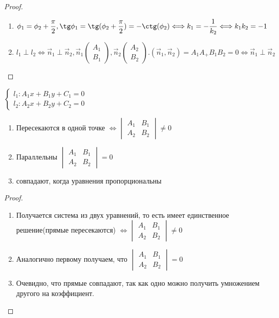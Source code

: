 \begin{proof}
	\begin{enumerate}
		\item \(\phi_1 = \phi_2 + \dfrac{\pi}{2}, \tg\phi_1 = \tg(\phi_2 + \dfrac{\pi}{2}) = -\ctg(\phi_2)\Longleftrightarrow k_1 = -\dfrac{1}{k_2}\Longleftrightarrow k_1k_2 = -1\)
		\item \(l_1 \perp l_2 \Longleftrightarrow \vec n_1 \perp \vec n_2, \vec n_1\begin{pmatrix}
			A_1 \\ B_1
		\end{pmatrix}, \vec n_2 \begin{pmatrix}
		A_2 \\ B_2
		\end{pmatrix}. (\vec n_1, \vec n_2) = A_1A_+B_1B_2 = 0 \Longleftrightarrow \vec n_1 \perp \vec n_2\)
	\end{enumerate}
\end{proof}
\begin{proposition}
	\(\left\{
	\begin{gathered}
		l_1: A_1x+B_1y+C_1 = 0 \\
		l_2: A_2x + B_2y + C_2 = 0
	\end{gathered}
	\right.\)
	\newline
	\begin{enumerate}
		\item Пересекаются в одной точке $\Longleftrightarrow \begin{vmatrix}
			A_1 & B_1 \\ A_2 & B_2
		\end{vmatrix} \ne 0$
		\item Параллельны $\begin{vmatrix}
			A_1 & B_1 \\ A_2 & B_2
		\end{vmatrix} = 0$
		\item совпадают, когда уравнения пропорциональны
	\end{enumerate}
\end{proposition}
\begin{proof}
	\begin{enumerate}
		\item Получается система из двух уравнений, то есть имеет единственное решение(прямые пересекаются) $\Longleftrightarrow \begin{vmatrix}
			A_1 & B_1 \\ A_2 & B_2
		\end{vmatrix} \ne 0$
		\item Аналогично первому получаем, что \(\begin{vmatrix}
			A_1 & B_1 \\ A_2 & B_2
		\end{vmatrix} = 0\)
		\item Очевидно, что прямые совпадают, так как одно можно получить умножением другого на коэффициент.
	\end{enumerate}
\end{proof}
